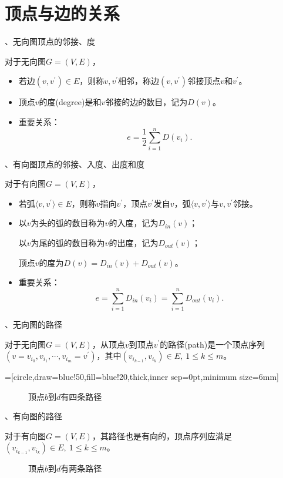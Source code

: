 \documentclass[10pt]{article}
\newcommand{\cd}{\cdots}
\begin{document}
\section{顶点与边的关系}

、无向图顶点的邻接、度

对于无向图$G=(V,E)$，
\begin{itemize}
\item 
若边$(v,v^\prime)\in E$，则称$v,v^\prime$相邻，称边$(v,v^\prime)$邻接顶点$v$和$v^\prime$。 \item 
顶点$v$的度(degree)是和$v$邻接的边的数目，记为$D(v)$。 \item 重要关系：
$$
e=\frac12 \sum_{i=1}^n D(v_i).
$$
\end{itemize}
 

、有向图顶点的邻接、入度、出度和度

对于有向图$G=(V,E)$，
\begin{itemize}
\item 
若弧$\langle v,v^\prime\rangle\in E$，则称$v$指向$v^\prime$，顶点$v^\prime$发自$v$，弧$\langle v,v^\prime\rangle$与$v,v^\prime$邻接。  
\item 
以$v$为头的弧的数目称为$v$的入度，记为$D_{in}(v)$；

以$v$为尾的弧的数目称为$v$的出度，记为$D_{out}(v)$；

顶点$v$的度为$D(v)=D_{in}(v)+D_{out}(v)$。 
\item 重要关系：
$$
e=\sum_{i=1}^n D_{in}(v_i)=\sum_{i=1}^n D_{out}(v_i).
$$
\end{itemize}
 
、无向图的路径

对于无向图$G=(V,E)$，从顶点$v$到顶点$v^\prime$的路径(path)是一个顶点序列$(v=v_{i_0}, v_{i_1}, \cd, v_{i_m}=v^\prime)$，其中$(v_{i_{k-1}},v_{i_{k}})\in E, ~1\le k \le m$。

=[circle,draw=blue!50,fill=blue!20,thick,inner sep=0pt,minimum size=6mm]

\begin{figure}[htbp]
\centering

\caption{顶点$b$到$d$有四条路径}
\end{figure}

、有向图的路径

对于有向图$G=(V,E)$，其路径也是有向的，顶点序列应满足$(v_{i_{k-1}},v_{i_{k}})\in E, ~1\le k \le m$。

\begin{figure}
\centering

\caption{顶点$b$到$d$有两条路径}
\end{figure}
\end{document}
